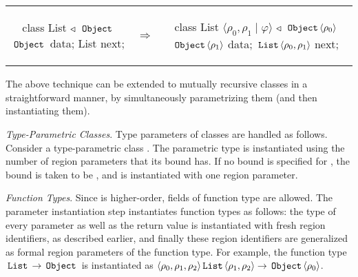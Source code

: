 \begin{tabular}{ccc}
\begin{minipage}{0.28\linewidth}
\begin{codejava}
class List
  $\triangleleft$ $\,{\tt Object}\,$
{
  $\,{\tt Object}\,$ data;
  List next;
}
\end{codejava}
\end{minipage}
&
$\Rightarrow$
&
\begin{minipage}{0.5\linewidth}
\begin{codejava}
class List $\langle \rho_0, \rho_1 \; | \; \varphi \rangle$
  $\triangleleft$ $\,{\tt Object}\, \langle \rho_0 \rangle$
{
  $\,{\tt Object}\, \langle \rho_1 \rangle$ data;
  $\,{\tt List}\, \langle \rho_0, \rho_1 \rangle$ next;
}
\end{codejava}
\end{minipage}
\end{tabular}

The above technique can be extended to mutually recursive classes in a
straightforward manner, by simultaneously parametrizing them (and
then instantiating them).

\emph{Type-Parametric Classes}.
Type parameters of classes are handled as follows.
Consider a type-parametric class .
The parametric type  is instantiated using the number of region parameters
that its bound  has. If no bound is specified for , the bound is taken
to be , and  is instantiated with one region parameter.

\emph{Function Types}.
Since \FB{} is higher-order, fields of function type are allowed. The parameter instantiation step
instantiates function types as follows: the type of every parameter as well as the return value is
instantiated with fresh region identifiers, as described earlier, and finally these region identifiers
are generalized as formal region parameters of the function type.
For example, the function type $\,{\tt List}\, \rightarrow \,{\tt Object}\,$ is instantiated as
$\langle \rho_0, \rho_1, \rho_2 \rangle \,{\tt List}\, \langle \rho_1,\rho_2 \rangle \rightarrow \,{\tt Object}\,\langle \rho_0 \rangle$.


